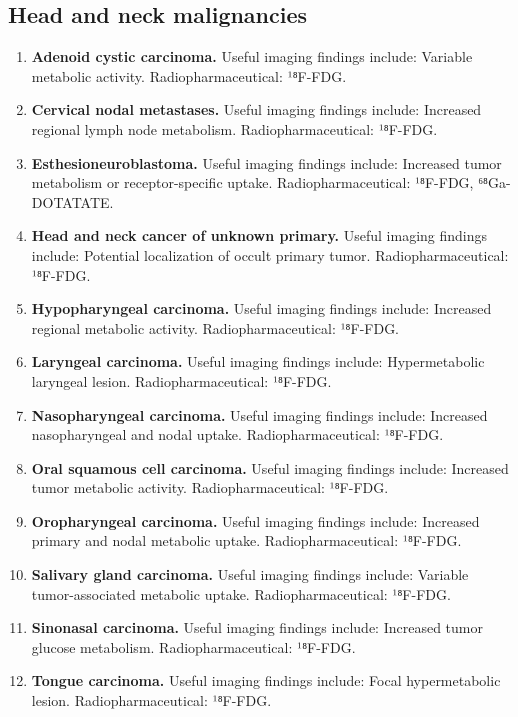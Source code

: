 \subsection{Head and neck malignancies}
\begin{enumerate}[leftmargin=*,itemsep=0.45em,topsep=0.4em]
\item \textbf{Adenoid cystic carcinoma.} Useful imaging findings include: Variable metabolic activity. Radiopharmaceutical: ¹⁸F-FDG.
\item \textbf{Cervical nodal metastases.} Useful imaging findings include: Increased regional lymph node metabolism. Radiopharmaceutical: ¹⁸F-FDG.
\item \textbf{Esthesioneuroblastoma.} Useful imaging findings include: Increased tumor metabolism or receptor-specific uptake. Radiopharmaceutical: ¹⁸F-FDG, ⁶⁸Ga-DOTATATE.
\item \textbf{Head and neck cancer of unknown primary.} Useful imaging findings include: Potential localization of occult primary tumor. Radiopharmaceutical: ¹⁸F-FDG.
\item \textbf{Hypopharyngeal carcinoma.} Useful imaging findings include: Increased regional metabolic activity. Radiopharmaceutical: ¹⁸F-FDG.
\item \textbf{Laryngeal carcinoma.} Useful imaging findings include: Hypermetabolic laryngeal lesion. Radiopharmaceutical: ¹⁸F-FDG.
\item \textbf{Nasopharyngeal carcinoma.} Useful imaging findings include: Increased nasopharyngeal and nodal uptake. Radiopharmaceutical: ¹⁸F-FDG.
\item \textbf{Oral squamous cell carcinoma.} Useful imaging findings include: Increased tumor metabolic activity. Radiopharmaceutical: ¹⁸F-FDG.
\item \textbf{Oropharyngeal carcinoma.} Useful imaging findings include: Increased primary and nodal metabolic uptake. Radiopharmaceutical: ¹⁸F-FDG.
\item \textbf{Salivary gland carcinoma.} Useful imaging findings include: Variable tumor-associated metabolic uptake. Radiopharmaceutical: ¹⁸F-FDG.
\item \textbf{Sinonasal carcinoma.} Useful imaging findings include: Increased tumor glucose metabolism. Radiopharmaceutical: ¹⁸F-FDG.
\item \textbf{Tongue carcinoma.} Useful imaging findings include: Focal hypermetabolic lesion. Radiopharmaceutical: ¹⁸F-FDG.
\end{enumerate}

